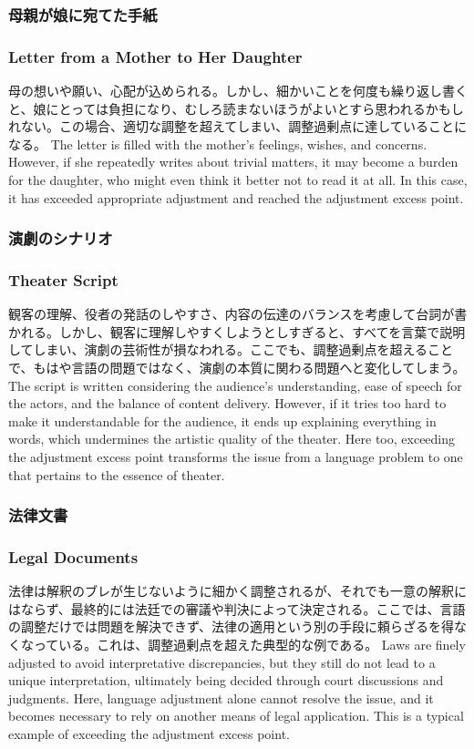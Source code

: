 \documentclass[a4paper,xelatex,ja=standard]{bxjsarticle}
\begin{document}
\ifJPN
\subsubsection*{母親が娘に宛てた手紙}
\else
  \subsubsection*{Letter from a Mother to Her Daughter}
\fi
\ifJPN
母の想いや願い、心配が込められる。しかし、細かいことを何度も繰り返し書くと、娘にとっては負担になり、むしろ読まないほうがよいとすら思われるかもしれない。この場合、適切な調整を超えてしまい、調整過剰点に達していることになる。
\else
  The letter is filled with the mother's feelings, wishes, and concerns. However, if she repeatedly writes about trivial matters, it may become a burden for the daughter, who might even think it better not to read it at all. In this case, it has exceeded appropriate adjustment and reached the adjustment excess point.
\fi

\ifJPN
\subsubsection*{演劇のシナリオ}
\else
  \subsubsection*{Theater Script}
\fi

\ifJPN
観客の理解、役者の発話のしやすさ、内容の伝達のバランスを考慮して台詞が書かれる。しかし、観客に理解しやすくしようとしすぎると、すべてを言葉で説明してしまい、演劇の芸術性が損なわれる。ここでも、調整過剰点を超えることで、もはや言語の問題ではなく、演劇の本質に関わる問題へと変化してしまう。
\else
  The script is written considering the audience's understanding, ease of speech for the actors, and the balance of content delivery. However, if it tries too hard to make it understandable for the audience, it ends up explaining everything in words, which undermines the artistic quality of the theater. Here too, exceeding the adjustment excess point transforms the issue from a language problem to one that pertains to the essence of theater.
\fi

\ifJPN
\subsubsection*{法律文書}
\else
  \subsubsection*{Legal Documents}
\fi
\ifJPN
法律は解釈のブレが生じないように細かく調整されるが、それでも一意の解釈にはならず、最終的には法廷での審議や判決によって決定される。ここでは、言語の調整だけでは問題を解決できず、法律の適用という別の手段に頼らざるを得なくなっている。これは、調整過剰点を超えた典型的な例である。
\else
  Laws are finely adjusted to avoid interpretative discrepancies, but they still do not lead to a unique interpretation, ultimately being decided through court discussions and judgments. Here, language adjustment alone cannot resolve the issue, and it becomes necessary to rely on another means of legal application. This is a typical example of exceeding the adjustment excess point.
\fi
\end{document}
